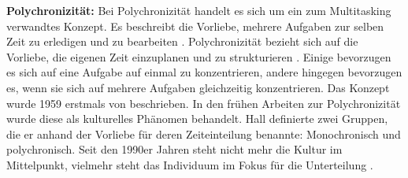 \par
\textbf{Polychronizität:}
Bei Polychronizität handelt es sich um ein zum Multitasking verwandtes Konzept. Es beschreibt die Vorliebe, mehrere Aufgaben zur selben Zeit zu erledigen und zu bearbeiten \cite{Baethge2010}. Polychronizität bezieht sich auf die Vorliebe, die eigenen Zeit einzuplanen und zu strukturieren \cite{Hecht2005}. Einige bevorzugen es sich auf eine Aufgabe auf einmal zu konzentrieren, andere hingegen bevorzugen es, wenn sie sich auf mehrere Aufgaben gleichzeitig konzentrieren. Das Konzept wurde 1959 erstmals von \cite{Hall1980} beschrieben. In den frühen Arbeiten zur Polychronizität wurde diese als kulturelles Phänomen behandelt. Hall definierte zwei Gruppen, die er anhand der Vorliebe für deren Zeiteinteilung benannte: Monochronisch und polychronisch. Seit den 1990er Jahren steht nicht mehr die Kultur im Mittelpunkt, vielmehr steht das Individuum im Fokus für die Unterteilung \cite{Baethge2010}.

